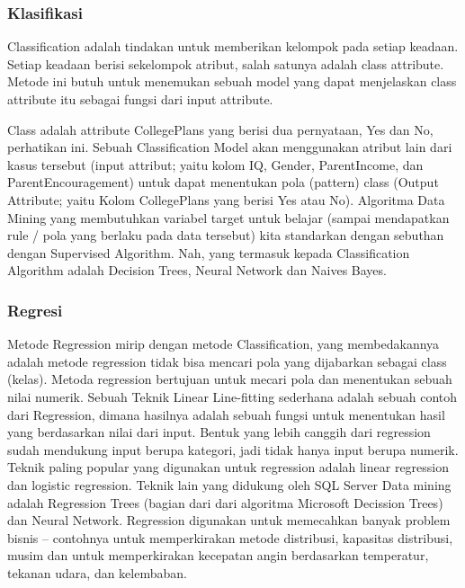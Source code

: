 \subsubsection{Klasifikasi}
\hfill\break
Classification adalah tindakan untuk memberikan kelompok pada setiap keadaan. Setiap keadaan berisi sekelompok atribut, salah satunya adalah class attribute. Metode ini butuh untuk menemukan sebuah model yang dapat menjelaskan class attribute itu sebagai fungsi dari input attribute.

\noindent
Class adalah attribute CollegePlans yang berisi dua pernyataan, Yes dan No, perhatikan ini.
\noindent
Sebuah Classification Model akan menggunakan atribut lain dari kasus tersebut (input attribut; yaitu kolom IQ, Gender, ParentIncome, dan ParentEncouragement) untuk dapat menentukan pola (pattern) class (Output Attribute; yaitu Kolom CollegePlans yang berisi Yes atau No).
\noindent
Algoritma Data Mining yang membutuhkan variabel target untuk belajar (sampai mendapatkan rule / pola yang berlaku pada data tersebut) kita standarkan dengan sebuthan dengan Supervised Algorithm.
\noindent
Nah, yang termasuk kepada Classification Algorithm adalah Decision Trees, Neural Network dan Naives Bayes.
\subsubsection{Regresi}
\hfill\break
Metode Regression mirip dengan metode Classification, yang membedakannya adalah metode regression tidak bisa mencari pola yang dijabarkan sebagai class (kelas).
\noindent
Metoda regression bertujuan untuk mecari pola dan menentukan sebuah nilai numerik.
\noindent
Sebuah Teknik Linear Line-fitting sederhana adalah sebuah contoh dari Regression, dimana hasilnya adalah sebuah fungsi untuk menentukan hasil yang berdasarkan nilai dari input.
\noindent
Bentuk yang lebih canggih dari regression sudah mendukung input berupa kategori, jadi tidak hanya input berupa numerik. Teknik paling popular yang digunakan untuk regression adalah linear regression dan logistic regression. Teknik lain yang didukung oleh SQL Server Data mining adalah Regression Trees (bagian dari dari algoritma Microsoft Decission Trees) dan Neural Network.
\noindent
Regression digunakan untuk memecahkan banyak problem bisnis – contohnya untuk memperkirakan metode distribusi, kapasitas distribusi, musim dan untuk memperkirakan kecepatan angin berdasarkan temperatur, tekanan udara, dan kelembaban.
